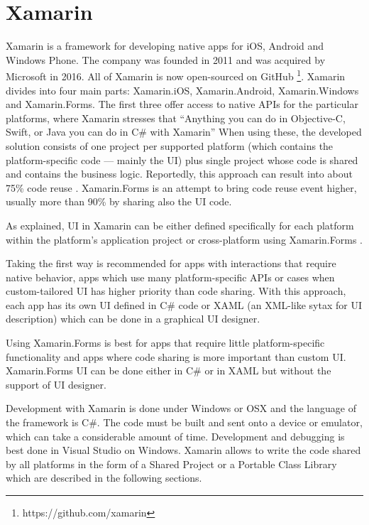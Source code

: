 \section{Xamarin}

Xamarin is a framework for developing native apps for iOS, Android and Windows Phone. The company was founded in 2011 and was acquired by Microsoft in 2016. All of Xamarin is now open-sourced on GitHub \footnote{https://github.com/xamarin}. 
Xamarin divides into four main parts: Xamarin.iOS, Xamarin.Android, Xamarin.Windows and Xamarin.Forms. The first three offer access to native APIs for the particular platforms, where Xamarin stresses that ``Anything you can do in Objective-C, Swift, or Java you can do in C\# with Xamarin'' \cite{xamarin:homepage} When using these, the developed solution consists of one project per supported platform (which contains the platform-specific code --- mainly the UI) plus single project whose code is shared and contains the business logic. Reportedly, this approach can result into about 75\% code reuse \cite{xamarin:codereuse}. Xamarin.Forms is an attempt to bring code reuse event higher, usually more than 90\% \cite{xamarin:codereuse} by sharing also the UI code.

As explained, UI in Xamarin can be either defined specifically for each platform within the platform's application project or cross-platform using Xamarin.Forms \cite{xamarin:forms}.

Taking the first way is recommended for apps with interactions that require native behavior, apps which use many platform-specific APIs or cases when custom-tailored UI has higher priority than code sharing. With this approach, each app has its own UI defined in C\# code or XAML (an XML-like sytax for UI description) which can be done in a graphical UI designer.

Using Xamarin.Forms is best for apps that require little platform-specific functionality and apps where code sharing is more important than custom UI. Xamarin.Forms UI can be done either in C\# or in XAML but without the support of UI designer.

Development with Xamarin is done under Windows or OSX and the language of the framework is C\#. The code must be built and sent onto a device or emulator, which can take a considerable amount of time. Development and debugging is best done in Visual Studio on Windows. Xamarin allows to write the code shared by all platforms in the form of a Shared Project or a Portable Class Library \cite{xamarin:sharing_code} which are described in the following sections. 


